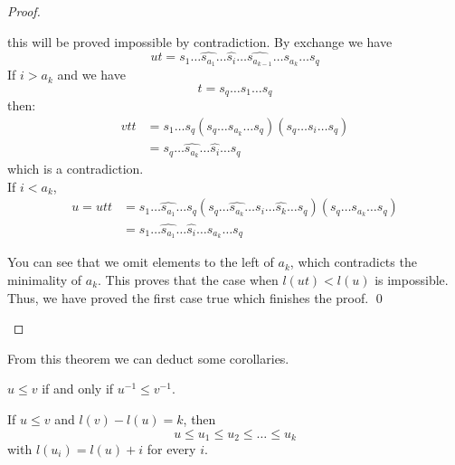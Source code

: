\begin{proof}
\begin{itemize}
  this will be proved impossible by contradiction. By exchange we have
  \begin{equation}
    ut = s_1 \dots \hat{s_{a_1}} \dots \hat{s_{i}} \dots \hat{s_{a_{k-1}}} \dots s_{a_{k}} \dots s_q
  \end{equation}
  If $i > a_k$ and we have
  \begin{equation}
    t = s_q \dots s_1 \dots s_q
  \end{equation}
then:
  \begin{equation}
    \begin{split}
      vtt &= s_1 \dots s_q (s_q \dots s_{a_k} \dots s_q)(s_q \dots s_i \dots s_q)\\
      &= s_q \dots \hat{s_{a_k}} \dots \hat{s_i} \dots s_q
    \end{split}
  \end{equation}
  which is a contradiction.\\

  If $i < a_k$,
  \begin{equation}
    \begin{split}
      u = utt &= s_1 \dots \hat{s_{a_1}} \dots s_q (s_q \dots \hat{s_{a_k}} \dots s_i \dots \hat{s_k} \dots s_q) (s_q \dots s_{a_k} \dots{s_q})\\
      &= s_1 \dots \hat{s_{a_1}} \dots \hat{s_i} \dots s_{a_k} \dots s_q
    \end{split}
  \end{equation}

  You can see that we omit elements to the left of $a_k$, which contradicts the minimality of $a_k$. This proves that the case when $l(ut) < l(u)$ is impossible. Thus, we have proved the first case true which finishes the proof. \qed

\end{itemize}
\end{proof}

From this theorem we can deduct some corollaries.

\begin{corollary}
  $u \leq v$ if and only if $u^{-1} \leq v^{-1}$.
\end{corollary}

\begin{corollary}
  If $u \leq v$ and $l(v) - l(u) = k$, then
  \begin{equation}
    u \leq u_1 \leq u_2 \leq \dots \leq u_k
  \end{equation}
  with $l(u_i) = l(u) + i$ for every $i$.
\end{corollary}

